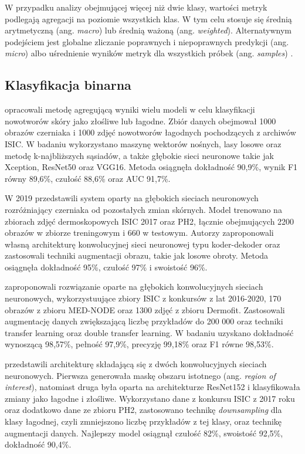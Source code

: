 W przypadku analizy obejmującej więcej niż dwie klasy, wartości metryk podlegają agregacji na poziomie wszystkich klas.
W tym celu stosuje się średnią arytmetyczną (ang. \textit{macro}) lub średnią ważoną (ang. \textit{weighted}).
Alternatywnym podejściem jest globalne zliczanie poprawnych i niepoprawnych predykcji (ang. \textit{micro}) albo uśrednienie wyników metryk dla wszystkich próbek (ang. \textit{samples}) \cite{Nowak_2022}.


\subsection{Klasyfikacja binarna}
\citet{diagnostics12102472} opracowali metodę agregującą wyniki wielu modeli w celu klasyfikacji nowotworów skóry jako złośliwe lub łagodne.
Zbiór danych obejmował 1000 obrazów czerniaka i 1000 zdjęć nowotworów łagodnych pochodzących z archiwów ISIC.
W badaniu wykorzystano maszynę wektorów nośnych, lasy losowe oraz metodę k-najbliższych sąsiadów, a także głębokie sieci neuronowe takie jak Xception, ResNet50 oraz VGG16.
Metoda osiągnęła dokładność 90,9\%, wynik F1 równy 89,6\%, czułość 88,6\% oraz AUC 91,7\%.

W 2019 \citet{Adegun_Viriri_2020} przedstawili system oparty na głębokich sieciach neuronowych rozróżniający czerniaka od pozostałych zmian skórnych.
Model trenowano na zbiorach zdjęć dermoskopowych ISIC 2017 oraz PH2, łącznie obejmujących 2200 obrazów w zbiorze treningowym i 660 w testowym.
Autorzy zaproponowali własną architekturę konwolucyjnej sieci neuronowej typu koder-dekoder oraz zastosowali techniki augmentacji obrazu, takie jak losowe obroty.
Metoda osiągnęła dokładność 95\%, czułość 97\% i swoistość 96\%.

\citet{Alzubaidi_Al-Amidie_Al-Asadi_Humaidi_Al-Shamma_Fadhel_Zhang_Santamaría_Duan_2021} zaproponowali rozwiązanie oparte na głębokich konwolucyjnych sieciach neuronowych, wykorzystuujące zbiory ISIC z konkursów z lat 2016-2020, 170 obrazów z zbioru MED-NODE oraz 1300 zdjęć z zbioru Dermofit.
Zastosowali augmentację danych zwiększającą liczbę przykładów do 200 000 oraz techniki transfer learning oraz double transfer learning.
W badaniu uzyskano dokładność wynoszącą 98,57\%, pełność 97,9\%, precyzję 99,18\% oraz F1 równe 98,53\%.

\citet{Percybrooks_2021} przedstawili architekturę składającą się z dwóch konwolucyjnych sieciach neuronowych.
Pierwsza generowała maskę obszaru istotnego (ang. \textit{region of interest}), natomiast druga była oparta na architekturze ResNet152 i klasyfikowała zmiany jako łagodne i złośliwe.
Wykorzystano dane z konkursu ISIC z 2017 roku oraz dodatkowo dane ze zbioru PH2, zastosowano technikę \textit{downsampling} dla klasy łagodnej, czyli zmniejszono liczbę przykładów z tej klasy, oraz technikę augmentacji danych.
Najlepszy model osiągnął czułość 82\%, swoistość 92,5\%, dokładność 90,4\%.


